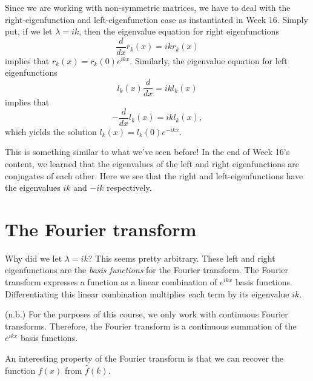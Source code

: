 \documentclass[a4paper, 12pt,oneside,openany]{book}
\begin{document}
Since we are working with non-symmetric matrices, we have to deal with the right-eigenfunction and left-eigenfunction case as instantiated in Week 16. Simply put, if we let $\lambda=ik$, then the eigenvalue equation for right eigenfunctions $$\frac{d}{dx} r_k(x) = ik r_k(x)$$ implies that $r_k(x) = r_k(0) e^{ikx}$. Similarly, the eigenvalue equation for left eigenfunctions $$l_k(x) \frac{d}{dx}= ik l_k(x)$$ implies that $$-\frac{d}{dx} l_k(x) = ik l_k(x),$$ which yields the solution $l_k(x) = l_k(0) e^{-ikx}$. 

This is something similar to what we've seen before! In the end of Week 16's content, we learned that the eigenvalues of the left and right eigenfunctions are conjugates of each other. Here we see that the right and left-eigenfunctions have the eigenvalues $ik$ and $-ik$ respectively. 

\section{The Fourier transform}

Why did we let $\lambda=ik$? This seems pretty arbitrary. These left and right eigenfunctions are the \emph{basis functions} for the Fourier transform. The Fourier transform expresses a function as a linear combination of $e^{ikx}$ basis functions. Differentiating this linear combination multiplies each term by its eigenvalue $ik$.

(n.b.) For the purposes of this course, we only work with continuous Fourier transforms. Therefore, the Fourier transform is a continuous summation of the $e^{ikx}$ basis functions.



An interesting property of the Fourier transform is that we can recover the function $f(x)$ from $\hat{f}(k)$.
\end{document}
